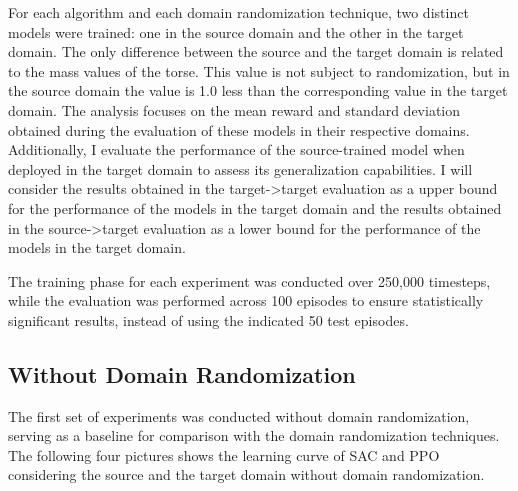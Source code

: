 \documentclass[12pt]{article}
\begin{document}
For each algorithm and each domain randomization technique, two distinct models were trained: one in the source domain and the other in the target domain. The only difference between the source and the target domain is related to the mass values of the torse. This value is not subject to randomization, but in the source domain the value is 1.0 less than the corresponding value in the target domain. 
The analysis focuses on the mean reward and standard deviation obtained during the evaluation of these models in their respective domains. Additionally, I evaluate the performance of the source-trained model when deployed in the target domain to assess its generalization capabilities. I will consider the results obtained in the target->target evaluation as a upper bound for the performance of the models in the target domain and the results obtained in the source->target evaluation as a lower bound for the performance of the models in the target domain. 

The training phase for each experiment was conducted over 250,000 timesteps, while the evaluation was performed across 100 episodes to ensure statistically significant results, instead of using the indicated 50 test episodes.

\subsection{Without Domain Randomization}

The first set of experiments was conducted without domain randomization, serving as a baseline for comparison with the domain randomization techniques. The following four pictures shows the learning curve of SAC and PPO considering the source and the target domain without domain randomization.
\end{document}

